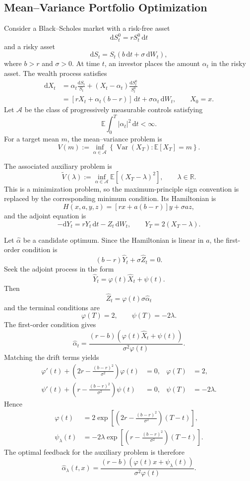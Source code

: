\subsection{Mean--Variance Portfolio Optimization}

Consider a Black--Scholes market with a risk-free asset
\[
\mathrm dS_t^0=rS_t^0\,\mathrm dt
\]
and a risky asset
\[
\mathrm dS_t=S_t(b\,\mathrm dt+\sigma\,\mathrm dW_t),
\]
where \(b>r\) and \(\sigma>0\). At time \(t\), an investor places the amount \(\alpha_t\) in the risky asset. The wealth process satisfies
\[
\begin{aligned}
\mathrm dX_t
&=\alpha_t\frac{\mathrm dS_t}{S_t}
+(X_t-\alpha_t)\frac{\mathrm dS_t^0}{S_t^0}\\
&=[rX_t+\alpha_t(b-r)]\,\mathrm dt
+\sigma\alpha_t\,\mathrm dW_t,
\qquad X_0=x.
\end{aligned}
\]
Let \(\mathcal A\) be the class of progressively measurable controls satisfying
\[
\mathbb E\int_0^T|\alpha_t|^2\,\mathrm dt<\infty.
\]
For a target mean \(m\), the mean--variance problem is
\[
V(m)
:=\inf_{\alpha\in\mathcal A}
\left\{
\operatorname{Var}(X_T):\mathbb E[X_T]=m
\right\}.
\]

The associated auxiliary problem is
\[
\widetilde V(\lambda)
:=\inf_{\alpha\in\mathcal A}
\mathbb E[(X_T-\lambda)^2],
\qquad \lambda\in\mathbb R.
\]
This is a minimization problem, so the maximum-principle sign convention is replaced by the corresponding minimum condition. Its Hamiltonian is
\[
H(x,a,y,z)
=[rx+a(b-r)]y+\sigma az,
\]
and the adjoint equation is
\[
-\mathrm dY_t=rY_t\,\mathrm dt-Z_t\,\mathrm dW_t,
\qquad Y_T=2(X_T-\lambda).
\]

Let \(\hat\alpha\) be a candidate optimum. Since the Hamiltonian is linear in \(a\), the first-order condition is
\[
(b-r)\hat Y_t+\sigma\hat Z_t=0.
\]
Seek the adjoint process in the form
\[
\hat Y_t=\varphi(t)\hat X_t+\psi(t).
\]
Then
\[
\hat Z_t=\varphi(t)\sigma\hat\alpha_t
\]
and the terminal conditions are
\[
\varphi(T)=2,
\qquad
\psi(T)=-2\lambda.
\]
The first-order condition gives
\[
\hat\alpha_t
=\frac{(r-b)(\varphi(t)\hat X_t+\psi(t))}
{\sigma^2\varphi(t)}.
\]
Matching the drift terms yields
\[
\begin{aligned}
\varphi'(t)
+\left(2r-\frac{(b-r)^2}{\sigma^2}\right)\varphi(t)&=0,
&\varphi(T)&=2,\\
\psi'(t)
+\left(r-\frac{(b-r)^2}{\sigma^2}\right)\psi(t)&=0,
&\psi(T)&=-2\lambda.
\end{aligned}
\]
Hence
\[
\begin{aligned}
\varphi(t)
&=2\exp\!\left[
\left(2r-\frac{(b-r)^2}{\sigma^2}\right)(T-t)
\right],\\
\psi_\lambda(t)
&=-2\lambda\exp\!\left[
\left(r-\frac{(b-r)^2}{\sigma^2}\right)(T-t)
\right].
\end{aligned}
\]
The optimal feedback for the auxiliary problem is therefore
\[
\hat\alpha_\lambda(t,x)
=\frac{(r-b)(\varphi(t)x+\psi_\lambda(t))}
{\sigma^2\varphi(t)}.
\]

